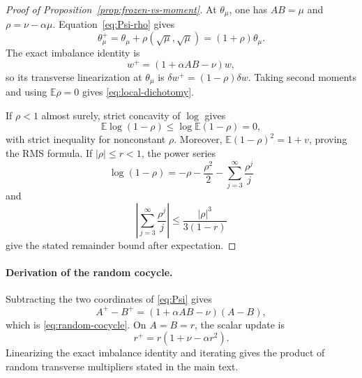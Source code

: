 \documentclass[11pt]{article}
\newcommand{\E}{\mathbb E}
\begin{document}
\begin{proof}[Proof of Proposition~\ref{prop:frozen-vs-moment}]
At \(\theta_\mu\), one has \(AB=\mu\) and
\(\rho=\nu-\alpha\mu\).  Equation~\eqref{eq:Psi-rho} gives
\[
\theta_\mu^+
=\theta_\mu+\rho(\sqrt\mu,\sqrt\mu)
=(1+\rho)\theta_\mu.
\]
The exact imbalance identity is
\[
w^+=(1+\alpha AB-\nu)w,
\]
so its transverse linearization at \(\theta_\mu\) is
\(\delta w^+=(1-\rho)\delta w\).  Taking second moments and using
\(\E\rho=0\) gives \eqref{eq:local-dichotomy}.

If \(\rho<1\) almost surely, strict concavity of \(\log\) gives
\[
\E\log(1-\rho)
\le \log\E(1-\rho)=0,
\]
with strict inequality for nonconstant \(\rho\).  Moreover,
\(\E(1-\rho)^2=1+v\), proving the RMS formula.
If \(|\rho|\le r<1\), the power series
\[
\log(1-\rho)=-\rho-\frac{\rho^2}{2}
-\sum_{j=3}^\infty\frac{\rho^j}{j}
\]
and
\[
\left|\sum_{j=3}^\infty\frac{\rho^j}{j}\right|
\le \frac{|\rho|^3}{3(1-r)}
\]
give the stated remainder bound after expectation.
\end{proof}

\paragraph{Derivation of the random cocycle.}
Subtracting the two coordinates of \eqref{eq:Psi} gives
\[
A^+-B^+
=(1+\alpha AB-\nu)(A-B),
\]
which is \eqref{eq:random-cocycle}.  On \(A=B=r\), the scalar update is
\[
r^+=r(1+\nu-\alpha r^2).
\]
Linearizing the exact imbalance identity and iterating gives the product of
random transverse multipliers stated in the main text.
\end{document}
